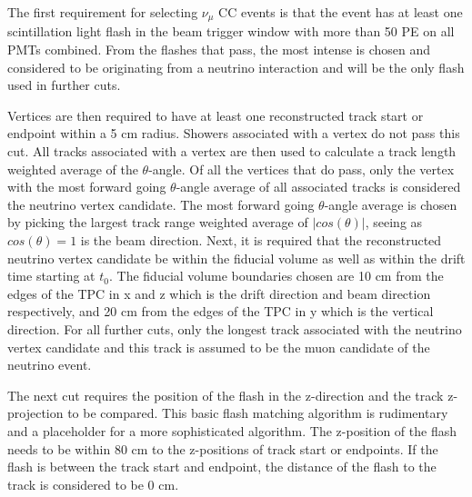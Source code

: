The first requirement for selecting $\nu_{\mu}$ CC events is that the event has at least one scintillation light flash in the beam trigger window with more than 50 PE on all PMTs combined. From the flashes that pass, the most intense is chosen and considered to be originating from a neutrino interaction and will be the only flash used in further cuts. 

Vertices are then required to have at least one reconstructed track start or endpoint within a 5 cm radius. Showers associated with a vertex do not pass this cut. All tracks associated with a vertex are then used to calculate a track length weighted average of the $\theta$-angle. Of all the vertices that do pass, only the vertex with the most forward going $\theta$-angle average of all associated tracks is considered the neutrino vertex candidate. The most forward going $\theta$-angle average is chosen by picking the largest track range weighted average of $|cos(\theta)|$, seeing as $cos(\theta)=1$ is the beam direction. Next, it is required that the reconstructed neutrino vertex candidate be within the fiducial volume as well as within the drift time starting at $t_0$. The fiducial volume boundaries chosen are 10 cm from the edges of the TPC in x and z which is the drift direction and beam direction respectively, and 20 cm from the edges of the TPC in y which is the vertical direction. For all further cuts, only the longest track associated with the neutrino vertex candidate and this track is assumed to be the muon candidate of the neutrino event.

The next cut requires the position of the flash in the z-direction and the track z-projection to be compared. This basic flash matching algorithm is rudimentary and a placeholder for a more sophisticated algorithm. The z-position of the flash needs to be within 80 cm to the z-positions of track start or endpoints. If the flash is between the track start and endpoint, the distance of the flash to the track is considered to be 0 cm. 

